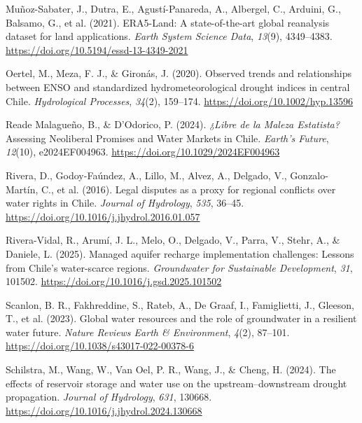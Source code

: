 \documentclass[
]{agujournal2019}
\newlength{\cslhangindent}
\newenvironment{CSLReferences}[2] %
 {\begin{list}{}{%
  \setlength{\itemindent}{0pt}
  \setlength{\leftmargin}{0pt}
  \setlength{\parsep}{0pt}
  \ifodd #1
   \setlength{\leftmargin}{\cslhangindent}
   \setlength{\itemindent}{-1\cslhangindent}
  \fi
  \setlength{\itemsep}{#2\baselineskip}}}
 {\end{list}}
\begin{document}
\begin{CSLReferences}{1}{0}
Muñoz-Sabater, J., Dutra, E., Agustí-Panareda, A., Albergel, C.,
Arduini, G., Balsamo, G., et al. (2021). {ERA5}-{Land}: A
state-of-the-art global reanalysis dataset for land applications.
\emph{Earth System Science Data}, \emph{13}(9), 4349--4383.
\url{https://doi.org/10.5194/essd-13-4349-2021}

Oertel, M., Meza, F. J., \& Gironás, J. (2020). Observed trends and
relationships between {ENSO} and standardized hydrometeorological
drought indices in central {Chile}. \emph{Hydrological Processes},
\emph{34}(2), 159--174. \url{https://doi.org/10.1002/hyp.13596}

Reade Malagueño, B., \& D'Odorico, P. (2024). \emph{¿{Libre} de la
{Maleza} {Estatista}?} {Assessing} {Neoliberal} {Promises} and {Water}
{Markets} in {Chile}. \emph{Earth's Future}, \emph{12}(10),
e2024EF004963. \url{https://doi.org/10.1029/2024EF004963}

Rivera, D., Godoy-Faúndez, A., Lillo, M., Alvez, A., Delgado, V.,
Gonzalo-Martín, C., et al. (2016). Legal disputes as a proxy for
regional conflicts over water rights in {Chile}. \emph{Journal of
Hydrology}, \emph{535}, 36--45.
\url{https://doi.org/10.1016/j.jhydrol.2016.01.057}

Rivera-Vidal, R., Arumí, J. L., Melo, O., Delgado, V., Parra, V., Stehr,
A., \& Daniele, L. (2025). Managed aquifer recharge implementation
challenges: {Lessons} from {Chile}'s water-scarce regions.
\emph{Groundwater for Sustainable Development}, \emph{31}, 101502.
\url{https://doi.org/10.1016/j.gsd.2025.101502}

Scanlon, B. R., Fakhreddine, S., Rateb, A., De Graaf, I., Famiglietti,
J., Gleeson, T., et al. (2023). Global water resources and the role of
groundwater in a resilient water future. \emph{Nature Reviews Earth \&
Environment}, \emph{4}(2), 87--101.
\url{https://doi.org/10.1038/s43017-022-00378-6}

Schilstra, M., Wang, W., Van Oel, P. R., Wang, J., \& Cheng, H. (2024).
The effects of reservoir storage and water use on the
upstream--downstream drought propagation. \emph{Journal of Hydrology},
\emph{631}, 130668. \url{https://doi.org/10.1016/j.jhydrol.2024.130668}


\end{CSLReferences}
\end{document}

